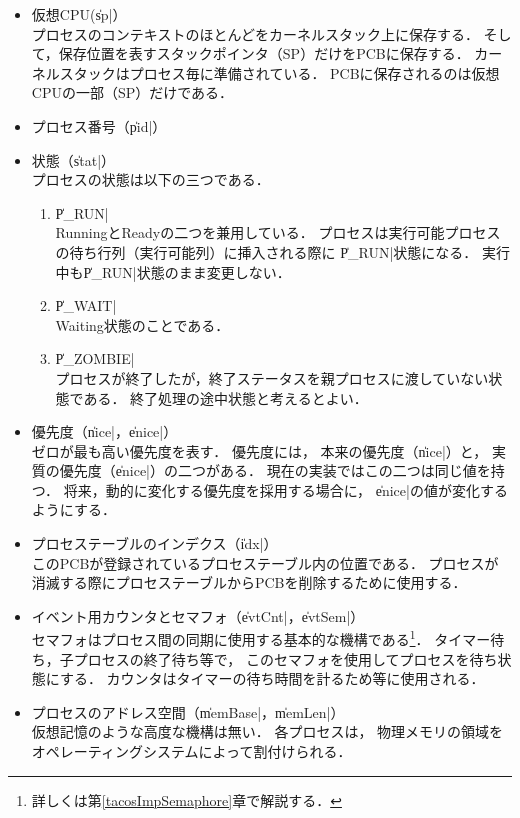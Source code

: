 \begin{itemize}
\item 仮想CPU(\|sp|） \\
  プロセスのコンテキストのほとんどをカーネルスタック上に保存する．
  そして，保存位置を表すスタックポインタ（SP）だけをPCBに保存する．
  カーネルスタックはプロセス毎に準備されている．
  PCBに保存されるのは仮想CPUの一部（SP）だけである．
\item プロセス番号（\|pid|）
\item 状態（\|stat|） \\
  プロセスの状態は以下の三つである．
  \begin{enumerate}
  \item \|P_RUN| \\
    RunningとReadyの二つを兼用している．
    プロセスは実行可能プロセスの待ち行列（実行可能列）に挿入される際に
    \|P_RUN|状態になる．
    実行中も\|P_RUN|状態のまま変更しない．
  \item \|P_WAIT| \\
    Waiting状態のことである．
  \item \|P_ZOMBIE| \\
    プロセスが終了したが，終了ステータスを親プロセスに渡していない状態である．
    終了処理の途中状態と考えるとよい．
  \end{enumerate}
\item 優先度（\|nice|，\|enice|） \\
  ゼロが最も高い優先度を表す．
  優先度には，
  本来の優先度（\|nice|）と，
  実質の優先度（\|enice|）の二つがある．
  現在の実装ではこの二つは同じ値を持つ．
  将来，動的に変化する優先度を採用する場合に，
  \|enice|の値が変化するようにする．
\item プロセステーブルのインデクス（\|idx|） \\
  このPCBが登録されているプロセステーブル内の位置である．
  プロセスが消滅する際にプロセステーブルからPCBを削除するために使用する．
\item イベント用カウンタとセマフォ（\|evtCnt|，\|evtSem|） \\
  セマフォはプロセス間の同期に使用する基本的な機構である\footnote{
    詳しくは第\ref{tacosImpSemaphore}章で解説する．}．
  タイマー待ち，子プロセスの終了待ち等で，
  このセマフォを使用してプロセスを待ち状態にする．
  カウンタはタイマーの待ち時間を計るため等に使用される．
\item プロセスのアドレス空間（\|memBase|，\|memLen|） \\
  仮想記憶のような高度な機構は無い．
  各プロセスは，
  物理メモリの領域をオペレーティングシステムによって割付けられる．

\end{itemize}
